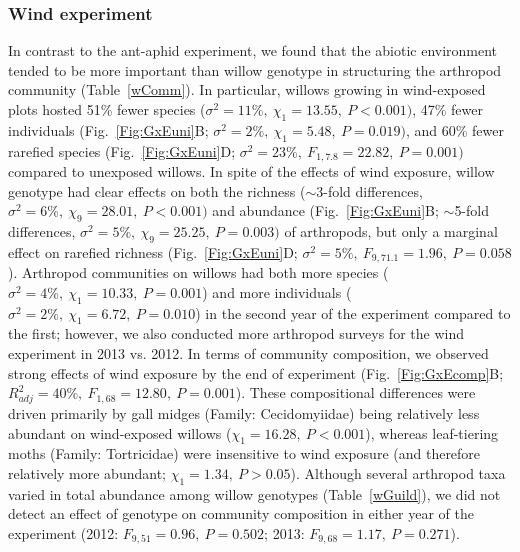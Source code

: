 \documentclass[11pt]{article}
\begin{document}
\subsubsection*{Wind experiment}

In contrast to the ant-aphid experiment, we found that the abiotic
environment tended to be more important than willow genotype in
structuring the arthropod community (Table~\ref{wComm}). In particular, willows
growing in wind-exposed plots hosted 51\% fewer species
(\(\sigma^2=11\%,\ \chi_1=13.55,\ P<0.001)\), 47\% fewer individuals (Fig.~\ref{Fig:GxEuni}B; \(\sigma^2=2\%,\ \chi_1=5.48,\ P=0.019)\),
and 60\% fewer rarefied species (Fig.~\ref{Fig:GxEuni}D; \(\sigma^2=23\%,\ F_{1,7.8}=22.82,\ P=0.001)\) compared to
unexposed willows. In spite of the effects of wind exposure, willow
genotype had clear effects on both the richness ($\sim$3-fold
differences, \(\sigma^2=6\%,\ \chi_9=28.01,\ P<0.001)\) and abundance (Fig.~\ref{Fig:GxEuni}B;
$\sim$5-fold differences, \(\sigma^2=5\%,\ \chi_9=25.25,\ P=0.003)\) of arthropods,
but only a marginal effect on rarefied richness (Fig.~\ref{Fig:GxEuni}D;
\(\sigma^2=5\%,\ F_{9,71.1}=1.96,\ P=0.058\)). Arthropod communities on willows had both more
species (\(\sigma^2=4\%,\ \chi_1=10.33,\ P=0.001\)) and more individuals (\(\sigma^2=2\%,\ \chi_1=6.72,\ P=0.010\)) in
the second year of the experiment compared to the first; however, we
also conducted more arthropod surveys for the wind experiment in 2013
vs. 2012. In terms of community composition, we observed strong effects
of wind exposure by the end of experiment (Fig.~\ref{Fig:GxEcomp}B; \(R_{adj}^2=40\%,\ F_{1,68}=12.80,\ P=0.001\)).
These compositional differences were driven primarily by gall midges
(Family: Cecidomyiidae) being relatively less abundant on wind-exposed
willows (\(\chi_1=16.28,\ P<0.001\)), whereas leaf-tiering moths (Family:
Tortricidae) were insensitive to wind exposure (and therefore relatively
more abundant; \(\chi_1=1.34,\ P>0.05\)). Although several arthropod taxa
varied in total abundance among willow genotypes (Table~\ref{wGuild}), we did not
detect an effect of genotype on community composition in either year of
the experiment (2012: \(F_{9,51}=0.96,\ P=0.502\); 2013: \(F_{9,68}=1.17,\ P=0.271\)).

\end{document}
